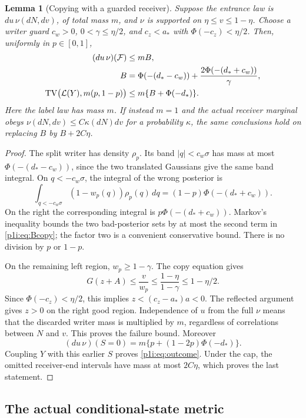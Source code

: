 \documentclass[11pt]{article}
\numberwithin{equation}{section}
\newtheorem{lemma}[theorem]{Lemma}
\theoremstyle{definition}
\theoremstyle{remark}
\begin{document}
\begin{lemma}[Copying with a guarded receiver]\label{p1i:lem:copy}
Suppose the entrance law is $du\,\nu(dN,dv)$, of total mass $m$, and $\nu$
is supported on $\eta\leq v\leq1-\eta$. Choose a writer guard $c_w>0$,
$0<\gamma\leq\eta/2$, and $c_z<a_*$ with
$\Phi(-c_z)<\eta/2$. Then, uniformly in $p\in[0,1]$,
\begin{align}
 (du\,\nu)(\mathcal F)&\leq m B,\notag\\
 B&=\Phi(-(d_*-c_w))
                  +\frac{2\Phi(-(d_*+c_w))}{\gamma},
 \label{p1i:eq:Bcopy}\\
 \operatorname{TV}\bigl(\mathcal L(Y),m(p,1-p)\bigr)
                 &\leq m\{B+\Phi(-d_*)\}.\label{p1i:eq:outcome}
\end{align}
Here the label law has mass $m$. If instead $m=1$ and the actual receiver
marginal obeys $\nu(dN,dv)\leq C\kappa(dN)dv$ for a probability $\kappa$,
the same conclusions hold on replacing $B$ by $B+2C\eta$.
\end{lemma}

\begin{proof}
The split writer has density $\rho_p$. Its band $|q|<c_w\sigma$ has mass
at most $\Phi(-(d_*-c_w))$, since the two translated Gaussians give the
same band integral. On $q<-c_w\sigma$, the integral of the wrong posterior
is
\[
 \int_{q<-c_w\sigma}(1-w_p(q))\rho_p(q)\,dq
       =(1-p)\Phi(-(d_*+c_w)).
\]
On the right the corresponding integral is
$p\Phi(-(d_*+c_w))$. Markov's inequality bounds the two bad-posterior
sets by at most the second term in \eqref{p1i:eq:Bcopy}; the factor two is
a convenient conservative bound. There is no division by $p$ or $1-p$.

On the remaining left region, $w_p\geq1-\gamma$. The copy equation gives
\[
 G(z+A)\leq\frac{v}{w_p}
 \leq\frac{1-\eta}{1-\gamma}\leq1-\eta/2.
\]
Since $\Phi(-c_z)<\eta/2$, this implies
$z<(c_z-a_*)a<0$. The reflected argument gives $z>0$ on the right good
region. Independence of $u$ from the full $\nu$ means that the discarded
writer mass is multiplied by $m$, regardless of correlations between
$N$ and $v$. This proves the failure bound. Moreover
\[
 (du\,\nu)(S=0)=m\{p+(1-2p)\Phi(-d_*)\}.
\]
Coupling $Y$ with this earlier $S$ proves \eqref{p1i:eq:outcome}.
Under the cap, the omitted receiver-end intervals have mass at most
$2C\eta$, which proves the last statement.
\end{proof}

\subsection{The actual conditional-state metric}
\end{document}
